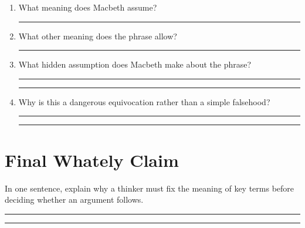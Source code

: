 \documentclass[12pt]{article}
\newcommand{\studentline}{\par\vspace{0.60em}\hrule\vspace{0.64em}}
\begin{document}
\begin{enumerate}[leftmargin=*]
\Needspace{0.12\textheight}\item What meaning does Macbeth assume?\studentline
\Needspace{0.12\textheight}\item What other meaning does the phrase allow?\studentline
\Needspace{0.14\textheight}\item What hidden assumption does Macbeth make about the phrase?\studentline\studentline
\Needspace{0.18\textheight}\item Why is this a dangerous equivocation rather than a simple falsehood?\studentline\studentline
\end{enumerate}

\Needspace{0.18\textheight}
\section*{Final Whately Claim}
In one sentence, explain why a thinker must fix the meaning of key terms before deciding whether an argument follows.

\studentline\studentline
\end{document}
